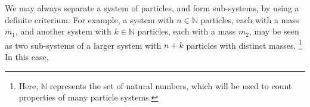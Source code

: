 We may always separate a system of particles, and form sub-systems, by using a definite criterium. For example, a system with $n\in\mathbb{N}$ particles, each with a mass $m_1$, and another system with $k\in\mathbb{N}$ particles, each with a mass $m_2$, may be seen as two sub-systems of a larger system with $n+k$ particles with distinct masses. \footnote{Here, $\mathbb{N}$ represents the set of natural numbers, which will be used to count properties of many particle systems.} In this case, 